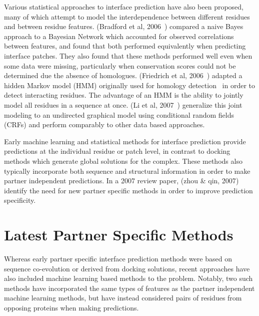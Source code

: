Various statistical approaches to interface prediction have also been proposed, many of which attempt to model the interdependence between different residues and between residue features.
(Bradford et al, 2006~\cite{bradford2006}) compared a naive Bayes approach to a Bayesian Network which accounted for observed correlations between features, and found that both performed equivalently when predicting interface patches.
They also found that these methods performed well even when some data were missing, particularly when conservation scores could not be determined due the absence of homologues.
(Friedrich et al, 2006~\cite{friedrich2006}) adapted a hidden Markov model (HMM) originally used for homology detection~\cite{eddy1998} in order to detect interacting residues.
The advantage of an HMM is the ability to jointly model all residues in a sequence at once.
(Li et al, 2007~\cite{li2007}) generalize this joint modeling to an undirected graphical model using conditional random fields (CRFs) and perform comparably to other data based approaches.

Early machine learning and statistical methods for interface prediction provide predictions at the individual residue or patch level, in contrast to docking methods which generate global solutions for the complex.
These methods also typically incorporate both sequence and structural information in order to make partner independent predictions.
In a 2007 review paper, (zhou \& qin, 2007\cite{zhou2007}) identify the need for new partner specific methods in order to improve prediction specificity.


\section{Latest Partner Specific Methods}

Whereas early partner specific interface prediction methods were based on sequence co-evolution or derived from docking solutions, recent approaches have also included machine learning based methods to the problem.
Notably, two such methods have incorporated the same types of features as the partner independent machine learning methods, but have instead considered pairs of residues from opposing proteins when making predictions. 

